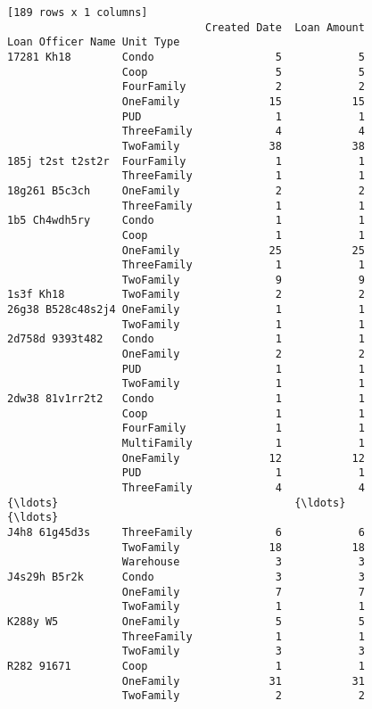 \documentclass[11pt]{article}
\begin{document}
\begin{Verbatim}[commandchars=\\\{\}]
[189 rows x 1 columns]
                               Created Date  Loan Amount
Loan Officer Name Unit Type                             
17281 Kh18        Condo                   5            5
                  Coop                    5            5
                  FourFamily              2            2
                  OneFamily              15           15
                  PUD                     1            1
                  ThreeFamily             4            4
                  TwoFamily              38           38
185j t2st t2st2r  FourFamily              1            1
                  ThreeFamily             1            1
18g261 B5c3ch     OneFamily               2            2
                  ThreeFamily             1            1
1b5 Ch4wdh5ry     Condo                   1            1
                  Coop                    1            1
                  OneFamily              25           25
                  ThreeFamily             1            1
                  TwoFamily               9            9
1s3f Kh18         TwoFamily               2            2
26g38 B528c48s2j4 OneFamily               1            1
                  TwoFamily               1            1
2d758d 9393t482   Condo                   1            1
                  OneFamily               2            2
                  PUD                     1            1
                  TwoFamily               1            1
2dw38 81v1rr2t2   Condo                   1            1
                  Coop                    1            1
                  FourFamily              1            1
                  MultiFamily             1            1
                  OneFamily              12           12
                  PUD                     1            1
                  ThreeFamily             4            4
{\ldots}                                     {\ldots}          {\ldots}
J4h8 61g45d3s     ThreeFamily             6            6
                  TwoFamily              18           18
                  Warehouse               3            3
J4s29h B5r2k      Condo                   3            3
                  OneFamily               7            7
                  TwoFamily               1            1
K288y W5          OneFamily               5            5
                  ThreeFamily             1            1
                  TwoFamily               3            3
R282 91671        Coop                    1            1
                  OneFamily              31           31
                  TwoFamily               2            2

\end{Verbatim}
\end{document}
